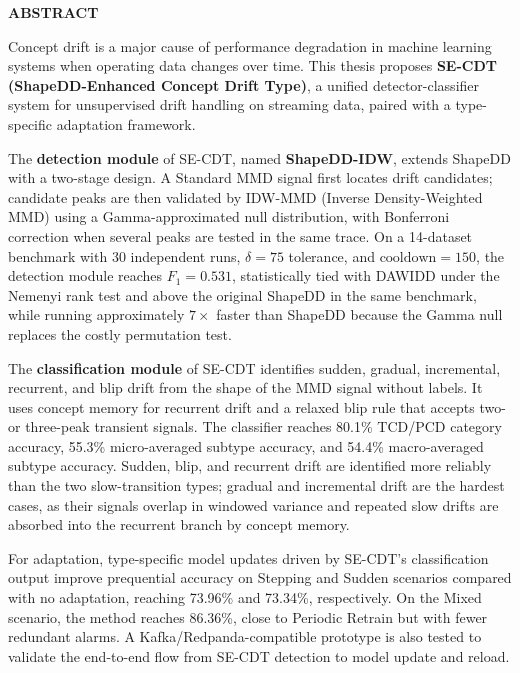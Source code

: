 \newpage

\setcounter{tocdepth}{0}

\begin{center}
    \Large \textbf{ABSTRACT}
\end{center}

Concept drift is a major cause of performance degradation in machine learning systems when operating data changes over time. This thesis proposes \textbf{SE-CDT (ShapeDD-Enhanced Concept Drift Type)}, a unified detector-classifier system for unsupervised drift handling on streaming data, paired with a type-specific adaptation framework.

The \textbf{detection module} of SE-CDT, named \textbf{ShapeDD-IDW}, extends ShapeDD with a two-stage design. A Standard MMD signal first locates drift candidates; candidate peaks are then validated by IDW-MMD (Inverse Density-Weighted MMD) using a Gamma-approximated null distribution, with Bonferroni correction when several peaks are tested in the same trace. On a 14-dataset benchmark with 30 independent runs, $\delta = 75$ tolerance, and $\text{cooldown} = 150$, the detection module reaches $F_1 = 0.531$, statistically tied with DAWIDD under the Nemenyi rank test and above the original ShapeDD in the same benchmark, while running approximately $7\times$ faster than ShapeDD because the Gamma null replaces the costly permutation test.

The \textbf{classification module} of SE-CDT identifies sudden, gradual, incremental, recurrent, and blip drift from the shape of the MMD signal without labels. It uses concept memory for recurrent drift and a relaxed blip rule that accepts two- or three-peak transient signals. The classifier reaches 80.1\% TCD/PCD category accuracy, 55.3\% micro-averaged subtype accuracy, and 54.4\% macro-averaged subtype accuracy. Sudden, blip, and recurrent drift are identified more reliably than the two slow-transition types; gradual and incremental drift are the hardest cases, as their signals overlap in windowed variance and repeated slow drifts are absorbed into the recurrent branch by concept memory.

For adaptation, type-specific model updates driven by SE-CDT's classification output improve prequential accuracy on Stepping and Sudden scenarios compared with no adaptation, reaching 73.96\% and 73.34\%, respectively. On the Mixed scenario, the method reaches 86.36\%, close to Periodic Retrain but with fewer redundant alarms. A Kafka/Redpanda-compatible prototype is also tested to validate the end-to-end flow from SE-CDT detection to model update and reload.

